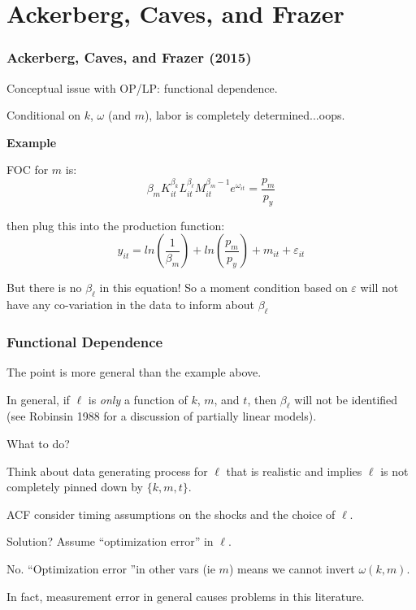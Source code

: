 \documentclass[11pt, aspectratio=169]{beamer}
\newenvironment{wideitemize}{\itemize\addtolength{\itemsep}{10pt}}{\enditemize}
\begin{document}


\section[ACF]{Ackerberg, Caves, and Frazer} %
\label{sec:ackerberg_caves_and_frazer}


\begin{frame}[c]\frametitle{Ackerberg, Caves, and Frazer (2015)}
    
Conceptual issue with OP/LP: functional dependence.
\begin{wideitemize}
    \item Conditional on $k$, $\omega$ (and $m$), labor is completely determined...oops.
\end{wideitemize}
        
\textbf{Example}        
\begin{wideitemize}
	\item FOC for $m$ is:
	$$\beta_m K_{it}^{\beta_k}L_{it}^{\beta_{\ell}}M_{it}^{\beta_m-1}e^{\omega_{it}} = \frac{p_m}{p_y}$$
	\item then plug this into the production function:
	$$y_{it} = ln(\frac{1}{\beta_m}) + ln(\frac{p_m}{p_y}) + m_{it} + \varepsilon_{it}$$
	\item But there is no $\beta_{\ell}$ in this equation! So a moment condition based on $\varepsilon$ will not have any co-variation in the data to inform about $\beta_{\ell}$
\end{wideitemize}


\end{frame}


\begin{frame}[c]\frametitle{Functional Dependence}

The point is more general than the example above. 
\begin{wideitemize}
	\item In general, if $\ell$ is \emph{only} a function of $k$, $m$, and $t$, then $\beta_{\ell}$ will not be identified (see Robinsin 1988 for a discussion of partially linear models). 
\end{wideitemize}

\bigskip
What to do?
\begin{wideitemize}
	\item Think about data generating process for $\ell$ that is realistic and implies $\ell$ is not completely pinned down by $\{k,m,t\}$.
	\item ACF consider timing assumptions on the shocks and the choice of $\ell$.
	\item Solution? Assume ``optimization error'' in $\ell$.
	\begin{wideitemize}
		\item No. ``Optimization error ''in other vars (ie $m$) means we cannot invert $\omega(k,m)$.
		\item In fact, measurement error in general causes problems in this literature. 
	\end{wideitemize}
	
\end{wideitemize}


\end{frame}
\end{document}
